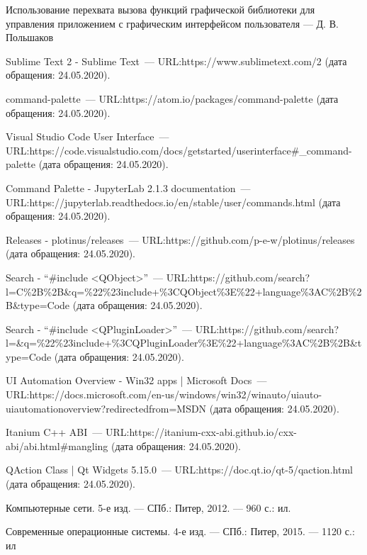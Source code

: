 \renewcommand{\bibname}{Список использованных источников}
\begin{thebibliography}{99}

 Использование перехвата вызова функций графической библиотеки для управления приложением с графическим интерфейсом пользователя --- Д. В. Польшаков

 Sublime Text 2 \-- Sublime Text~---
URL:\@ https://www.sublimetext.com/2
(дата обращения: 24.05.2020).

 command-palette~---
URL:\@ https://atom.io/packages/command-palette
(дата обращения: 24.05.2020).

 Visual Studio Code User Interface~---
URL:\@ https://code.visualstudio.com/docs/getstarted/userinterface\#\_command-palette
(дата обращения: 24.05.2020).

 Command Palette \-- JupyterLab 2.1.3 documentation~---
URL:\@ https://jupyterlab.readthedocs.io/en/stable/user/commands.html
(дата обращения: 24.05.2020).

 Releases \-- plotinus/releases~---
URL:\@  https://github.com/p-e-w/plotinus/releases
(дата обращения: 24.05.2020).

 Search \-- ``\#include <QObject>''~---
URL:\@ https://github.com/search?l=C\%2B\%2B\&q=\%22\%23include+\%3CQObject\%3E\%22+language\%3AC\%2B\%2B\&type=Code
(дата обращения: 24.05.2020).

 Search \-- ``\#include <QPluginLoader>''~---
URL:\@ https://github.com/search?l=\&q=\%22\%23include+\%3CQPluginLoader\%3E\%22+language\%3AC\%2B\%2B\&type=Code
(дата обращения: 24.05.2020).

 UI Automation Overview \-- Win32 apps | Microsoft Docs~---
URL:\@ https://docs.microsoft.com/en-us/windows/win32/winauto/uiauto-uiautomationoverview?redirectedfrom=MSDN
(дата обращения: 24.05.2020).

 Itanium C++ ABI~---
URL:\@ https://itanium-cxx-abi.github.io/cxx-abi/abi.html\#mangling
(дата обращения: 24.05.2020).

 QAction Class | Qt Widgets 5.15.0~---
URL:\@ https://doc.qt.io/qt-5/qaction.html
(дата обращения: 24.05.2020).

 Компьютерные сети. 5-е изд. — СПб.: Питер, 2012. — 960 с.: ил.

 Современные операционные системы. 4-е изд. — СПб.: Питер, 2015. — 1120 с.: ил

\end{thebibliography}
